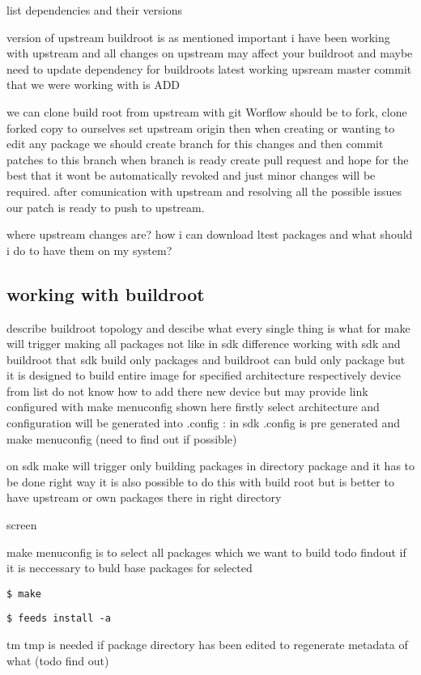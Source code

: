 list dependencies and their versions

version of upstream buildroot is as mentioned important i have been working with upstream and all changes on upstream may affect your buildroot and maybe need to update dependency for buildroots
latest working upsream master commit that we were working with is ADD

we can clone build root from upstream with git Worflow should be to fork, clone forked copy to ourselves set upstream origin then when creating or wanting to edit any package we should create branch for this changes and then commit patches to this branch
when branch is ready create pull request and hope for the best that it wont be automatically revoked and just minor changes will be required.
after comunication with upstream and resolving all the possible issues our patch is ready to push to upstream.

where upstream changes are? how i can download ltest packages and what should i do to have them on my system?

\subsection{working with buildroot}

describe buildroot topology and descibe what every single thing is what for
make will trigger making all packages not like in sdk
difference working with sdk and buildroot that sdk build only packages and buildroot can buld only package but it is designed to build entire image
for specified architecture respectively device from list
do not know how to add there new device but may provide link
configured with make menuconfig shown here firstly select architecture and configuration will be generated into .config :
in sdk .config is pre generated and make menuconfig (need to find out if possible)

on sdk make will trigger only building packages in directory package and it has to be done right way
it is also possible to do this with build root but is better to have upstream or own packages there in right directory

screen

make menuconfig is to select all packages which we want to build  todo findout if it is neccessary to buld base packages for selected

{\tt \$ make}

{\tt \$ feeds install -a}

tm tmp is needed if package directory has been edited to regenerate metadata of what (todo find out)

